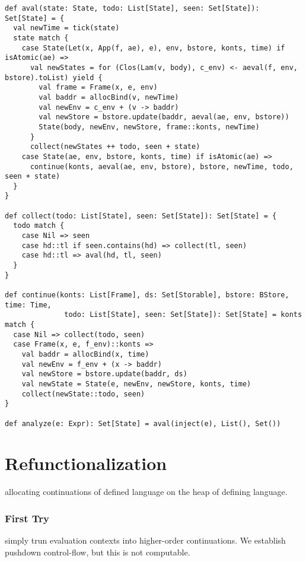\documentclass[acmsmall,review,anonymous]{acmart}\settopmatter{printfolios=true,printccs=false,printacmref=false}
\begin{document}
\begin{lstlisting}
def aval(state: State, todo: List[State], seen: Set[State]): Set[State] = { 
  val newTime = tick(state)
  state match {
    case State(Let(x, App(f, ae), e), env, bstore, konts, time) if isAtomic(ae) =>
      val newStates = for (Clos(Lam(v, body), c_env) <- aeval(f, env, bstore).toList) yield {
        val frame = Frame(x, e, env)
        val baddr = allocBind(v, newTime)
        val newEnv = c_env + (v -> baddr)
        val newStore = bstore.update(baddr, aeval(ae, env, bstore))
        State(body, newEnv, newStore, frame::konts, newTime)
      }   
      collect(newStates ++ todo, seen + state)
    case State(ae, env, bstore, konts, time) if isAtomic(ae) =>
      continue(konts, aeval(ae, env, bstore), bstore, newTime, todo, seen + state)
  }   
}

def collect(todo: List[State], seen: Set[State]): Set[State] = { 
  todo match {
    case Nil => seen
    case hd::tl if seen.contains(hd) => collect(tl, seen)
    case hd::tl => aval(hd, tl, seen)
  }   
}

def continue(konts: List[Frame], ds: Set[Storable], bstore: BStore, time: Time,
              todo: List[State], seen: Set[State]): Set[State] = konts match {
  case Nil => collect(todo, seen)
  case Frame(x, e, f_env)::konts =>
    val baddr = allocBind(x, time)
    val newEnv = f_env + (x -> baddr)
    val newStore = bstore.update(baddr, ds) 
    val newState = State(e, newEnv, newStore, konts, time)
    collect(newState::todo, seen)
}

def analyze(e: Expr): Set[State] = aval(inject(e), List(), Set()) 
\end{lstlisting}

\section{Refunctionalization}

allocating continuations of defined language on the heap of defining language.

\subsubsection{First Try}

simply trun evaluation contexts into higher-order continuations.
We establish pushdown control-flow, but this is not computable.
\end{document}

